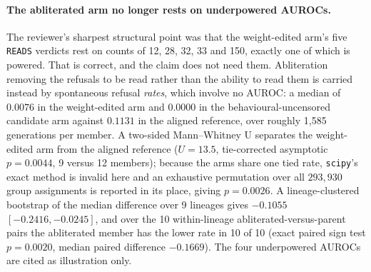 \documentclass[11pt,letterpaper]{article}
\begin{document}
\paragraph{The abliterated arm no longer rests on underpowered AUROCs.} The reviewer's sharpest structural point was that the weight-edited arm's five \texttt{READS} verdicts rest on counts of 12, 28, 32, 33 and 150, exactly one of which is powered. That is correct, and the claim does not need them. Abliteration removing the refusals to be read rather than the ability to read them is carried instead by spontaneous refusal \emph{rates}, which involve no AUROC: a median of $0.0076$ in the weight-edited arm and $0.0000$ in the behavioural-uncensored candidate arm against $0.1131$ in the aligned reference, over roughly 1,585 generations per member. A two-sided Mann--Whitney U separates the weight-edited arm from the aligned reference ($U = 13.5$, tie-corrected asymptotic $p = 0.0044$, 9 versus 12 members); because the arms share one tied rate, \texttt{scipy}'s exact method is invalid here and an exhaustive permutation over all $293{,}930$ group assignments is reported in its place, giving $p = 0.0026$. A lineage-clustered bootstrap of the median difference over 9 lineages gives $-0.1055$ $[-0.2416, -0.0245]$, and over the 10 within-lineage abliterated-versus-parent pairs the abliterated member has the lower rate in 10 of 10 (exact paired sign test $p = 0.0020$, median paired difference $-0.1669$). The four underpowered AUROCs are cited as illustration only.
\end{document}

